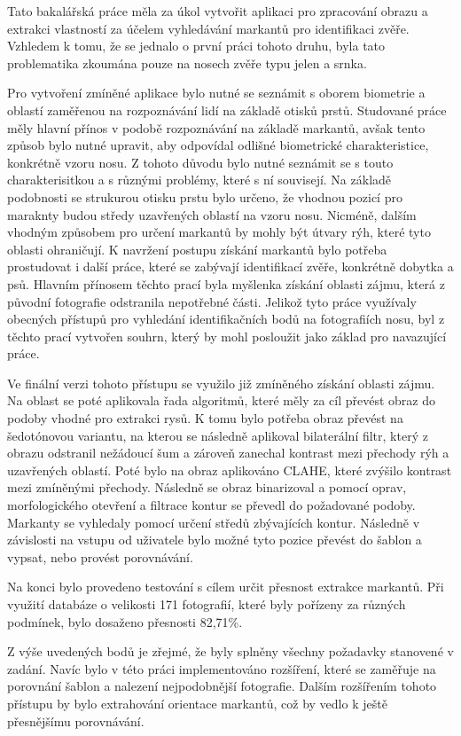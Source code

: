 Tato bakalářská práce měla za úkol vytvořit aplikaci pro zpracování obrazu a extrakci vlastností za účelem vyhledávání markantů pro identifikaci zvěře. Vzhledem k tomu, že se jednalo o první práci tohoto druhu, byla tato problematika zkoumána pouze na nosech zvěře typu jelen a srnka.

Pro vytvoření zmíněné aplikace bylo nutné se seznámit s oborem biometrie a oblastí zaměřenou na rozpoznávání lidí na základě otisků prstů. Studované práce měly hlavní přínos v podobě rozpoznávání na základě markantů, avšak tento způsob bylo nutné upravit, aby odpovídal odlišné biometrické charakteristice, konkrétně vzoru nosu. Z tohoto důvodu bylo nutné seznámit se s touto charakterisitkou a s různými problémy, které s ní souvisejí. Na základě podobnosti se strukurou otisku prstu bylo určeno, že vhodnou pozicí pro maraknty budou středy uzavřených oblastí na vzoru nosu. Nicméně, dalším vhodným způsobem pro určení markantů by mohly být útvary rýh, které tyto oblasti ohraničují. K navržení postupu získání markantů bylo potřeba prostudovat i další práce, které se zabývají identifikací zvěře, konkrétně dobytka a psů. Hlavním přínosem těchto prací byla myšlenka získání oblasti zájmu, která z původní fotografie odstranila nepotřebné části. Jelikož tyto práce využívaly obecných přístupů pro vyhledání identifikačních bodů na fotografiích nosu, byl z těchto prací vytvořen souhrn, který by mohl posloužit jako základ pro navazující práce. 

Ve finální verzi tohoto přístupu se využilo již zmíněného získání oblasti zájmu. Na oblast se poté aplikovala řada algoritmů, které měly za cíl převést obraz do podoby vhodné pro extrakci rysů. K tomu bylo potřeba obraz převést na šedotónovou variantu, na kterou se následně aplikoval bilaterální filtr, který z obrazu odstranil nežádoucí šum a zároveň zanechal kontrast mezi přechody rýh a uzavřených oblastí. Poté bylo na obraz aplikováno CLAHE, které zvýšilo kontrast mezi zmíněnými přechody. Následně se obraz binarizoval a pomocí oprav, morfologického otevření a filtrace kontur se převedl do požadované podoby. Markanty se vyhledaly pomocí určení středů zbývajících kontur. Následně v závislosti na vstupu od uživatele bylo možné tyto pozice převést do šablon a vypsat, nebo provést porovnávání.

Na konci bylo provedeno testování s cílem určit přesnost extrakce markantů. Při využití databáze o velikosti 171 fotografií, které byly pořízeny za různých podmínek, bylo dosaženo přesnosti 82,71\%.

Z výše uvedených bodů je zřejmé, že byly splněny všechny požadavky stanovené v zadání. Navíc bylo v této práci implementováno rozšíření, které se zaměřuje na porovnání šablon a nalezení nejpodobnější fotografie. Dalším rozšířením tohoto přístupu by bylo extrahování orientace markantů, což by vedlo k ještě přesnějšímu porovnávání.



%
